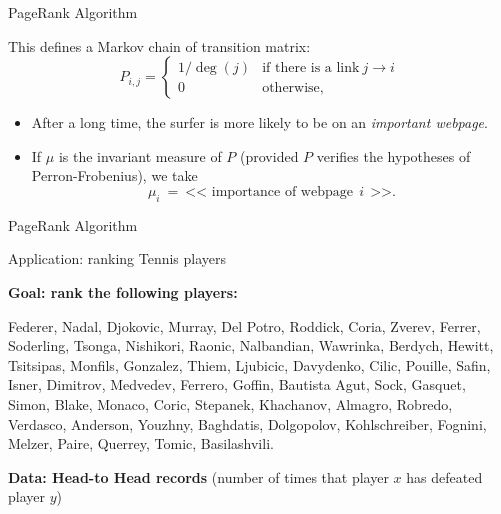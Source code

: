 \documentclass{beamer}
\begin{document}
\begin{frame}[t]{PageRank Algorithm}
	\grid

	This defines a Markov chain of transition matrix:
	$$
	P_{i,j} 
	= 
	\begin{cases}
		1 / \deg(j) & \text{if there is a link} \ j \to i \\
		0 & \text{otherwise},
	\end{cases}
	$$

	\vspace{0.6cm}
	\begin{itemize}
		\item After a long time, the surfer is more likely to be on an \emph{important webpage}.
			\vspace{0.3cm}
		\item If $\mu$ is the invariant measure of $P$ (provided $P$ verifies the hypotheses of Perron-Frobenius), we take
			$$
			\mu_i  \ = \ \text{<< importance of webpage}  \ \ i \ \ \text{>>}.
			$$
	\end{itemize}

\end{frame}


\begin{frame}[t]{PageRank Algorithm}
	\grid


\end{frame}

\begin{frame}[t]{Application: ranking Tennis players}
	\grid

	\vspace{0.5cm}
	\textbf{Goal: rank the following players:}
	\begin{center}
		Federer, Nadal, Djokovic, Murray, Del Potro, Roddick, Coria, Zverev, Ferrer, Soderling, Tsonga, Nishikori, Raonic, Nalbandian, Wawrinka, Berdych, Hewitt, Tsitsipas, Monfils, Gonzalez, Thiem, Ljubicic, Davydenko, Cilic, Pouille, Safin, Isner, Dimitrov, Medvedev, Ferrero, Goffin, Bautista Agut, Sock, Gasquet, Simon, Blake, Monaco, Coric, Stepanek, Khachanov, Almagro, Robredo, Verdasco, Anderson, Youzhny, Baghdatis, Dolgopolov, Kohlschreiber, Fognini, Melzer, Paire, Querrey, Tomic, Basilashvili.
	\end{center}
	\vspace{0.5cm}

	\textbf{Data: Head-to Head records} (number of times that player $x$ has defeated player $y$)

\end{frame}
\end{document}
